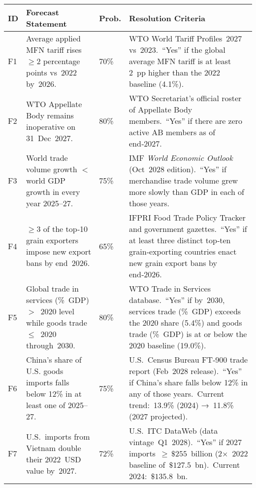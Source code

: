 \documentclass{article}
\begin{document}
\begin{longtable}{@{}>{\bfseries}p{} p{} p{} p{}@{}}
\toprule
ID & Forecast Statement & Prob. & Resolution Criteria \\
\midrule
\endhead
\bottomrule
\endfoot

F1 & Average applied MFN tariff rises $\geq 2$ percentage points vs 2022 by 2026. & 70\% & WTO World Tariff Profiles 2027 vs 2023. “Yes” if the global average MFN tariff is at least 2 pp higher than the 2022 baseline (4.1\%). \\
\midrule

F2 & WTO Appellate Body remains inoperative on 31 Dec 2027. & 80\% & WTO Secretariat’s official roster of Appellate Body members. “Yes” if there are zero active AB members as of end‑2027. \\
\midrule

F3 & World trade volume growth $<$ world GDP growth in every year 2025–27. & 75\% & IMF \emph{World Economic Outlook} (Oct 2028 edition). “Yes” if merchandise trade volume grew more slowly than GDP in each of those years. \\
\midrule

F4 & $\geq 3$ of the top‑10 grain exporters impose new export bans by end 2026. & 65\% & IFPRI Food Trade Policy Tracker and government gazettes. “\!Yes” if at least three distinct top‑ten grain‑exporting countries enact new grain export bans by end‑2026. \\
\midrule

F5 & Global trade in services (\% GDP) $>$ 2020 level while goods trade $\leq$ 2020 through 2030. & 80\% & WTO Trade in Services database. “\!Yes” if by 2030, services trade (\% GDP) exceeds the 2020 share (5.4\%) and goods trade (\% GDP) is at or below the 2020 baseline (19.0\%). \\
\midrule

F6 & China’s share of U.S. goods imports falls below 12\% in at least one of 2025–27. & 75\% & U.S. Census Bureau FT‑900 trade report (Feb 2028 release). “\!Yes” if China’s share falls below 12\% in any of those years. Current trend: 13.9\% (2024) → 11.8\% (2027 projected). \\
\midrule

F7 & U.S. imports from Vietnam double their 2022 USD value by 2027. & 72\% & U.S. ITC DataWeb (data vintage Q1 2028). “\!Yes” if 2027 imports $\geq\,\$255$ billion (2× 2022 baseline of $\$127.5$ bn). Current 2024: $\$135.8$ bn. \\
\midrule


\end{longtable}
\end{document}
